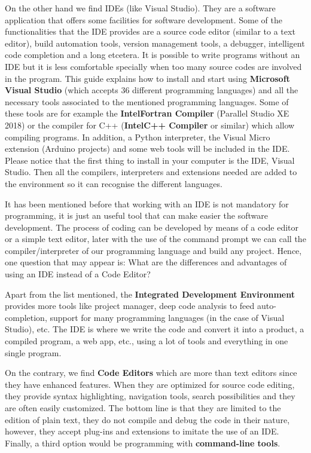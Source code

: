 On the other hand we find IDEs (like Visual Studio). They are a software application that offers some facilities for software development. Some of the functionalities that the IDE provides are a source code editor (similar to a text editor), build automation tools, version management tools, a debugger, intelligent code completion and a long etcetera. It is possible to write programs without an IDE but it is less comfortable specially when too many source codes are involved in the program. This guide explains how to install and start using \textbf{Microsoft Visual Studio} (which accepts 36 different programming languages) and all the necessary tools associated to the mentioned programming languages. Some of these tools are for example the \textbf{Intel\textregistered \hspace{0.1cm}Fortran Compiler} (Parallel Studio XE 2018) or the compiler for C++ (\textbf{Intel\textregistered \hspace{0.1cm}C++ Compiler} or similar) which allow compiling programs. In addition, a Python interpreter, the Visual Micro extension (Arduino projects) and some web tools will be included in the IDE. Please notice that the first thing to install in your computer is the IDE, Visual Studio. Then all the compilers, interpreters and extensions needed are added to the environment so it can recognise the different languages. 

It has been mentioned before that working with an IDE is not mandatory for programming, it is just an useful tool that can make easier the software development. The process of coding can be developed by means of a code editor or a simple text editor, later with the use of the command prompt we can call the compiler/interpreter of our programming language and build any project. Hence, one question that may appear is: What are the differences and advantages of using an IDE instead of a Code Editor? \label{sec:FAQVS}

Apart from the list mentioned, the \textbf{Integrated Development Environment} provides more tools like project manager, deep code analysis to feed auto-completion, support for many programming languages (in the case of Visual Studio), etc. The IDE is where we write the code and convert it into a product, a compiled program, a web app, etc., using a lot of tools and everything in one single program. 

On the contrary, we find \textbf{Code Editors} which are more than text editors since they have enhanced features. When they are optimized for source code editing, they provide syntax highlighting, navigation tools, search possibilities and they are often easily customized. The bottom line is that they are limited to the edition of plain text, they do not compile and debug the code in their nature, however, they accept plug-ins and extensions to imitate the use of an IDE. Finally, a third option would be programming with \textbf{command-line tools}.

